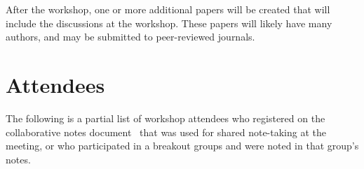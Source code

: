 \documentclass[11pt, oneside]{amsart}
\begin{document}
After the workshop, one or more additional papers will be created that will
include the discussions at the workshop. These papers will likely have many
authors, and may be submitted to peer-reviewed journals.

\appendix
\section{Attendees}  \label{sec:attendees}
The following is a partial list of workshop attendees who registered on the
collaborative notes document~\cite{WSSSPE2-google-notes} that was used
for shared note-taking at the meeting, or who participated in a breakout groups
and were noted in that group's notes.
\end{document}
